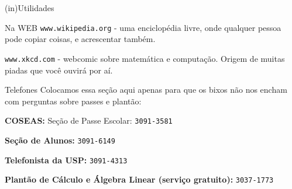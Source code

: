\begin{secao}{(in)Utilidades}
\begin{subsecao}{Na WEB}
{\tt www.wikipedia.org} - uma enciclopédia livre, onde qualquer pessoa pode
copiar coisas, e acrescentar também.

{\tt www.xkcd.com} - webcomic sobre matemática e computação. Origem de muitas piadas que você ouvirá por aí.

\end{subsecao}


\begin{subsecao}{Telefones}
Colocamos essa seção aqui apenas para que os bixos não nos encham com perguntas
sobre passes e plantão:

{\bf COSEAS:} Seção de Passe Escolar: {\tt 3091-3581}

{\bf Seção de Alunos:} {\tt 3091-6149}

{\bf Telefonista da USP:} {\tt 3091-4313}

{\bf Plantão de Cálculo e Álgebra Linear (serviço gratuito):} {\tt 3037-1773}

\end{subsecao}
\end{secao}

